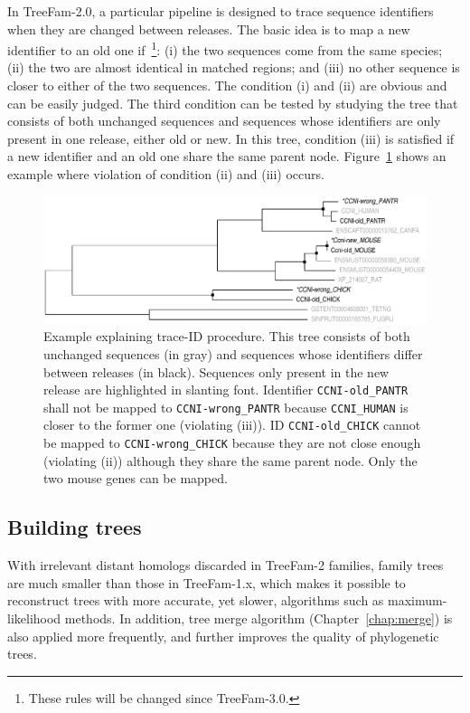 In TreeFam-2.0, a particular pipeline is designed to trace sequence identifiers when they are changed
between releases. The basic idea is to map a new identifier to an old one if~\footnote{These rules
will be changed since TreeFam-3.0.}: (i) the two
sequences come from the same species; (ii) the two are almost identical in matched regions;
and (iii) no other sequence is closer to either of the two sequences. The condition (i) and (ii)
are obvious and can be easily judged. The third condition can be tested by studying the
tree that consists of both unchanged sequences and sequences whose identifiers
are only present in one release, either old or new. In this tree, condition (iii) is satisfied if
a new identifier and an old one share the same parent node. Figure~\ref{fig:exam-traceid} shows
an example where violation of condition (ii) and (iii) occurs.

\begin{figure}[!hb]
\includegraphics[width=\textwidth]{traceid}
\caption[Example explaining trace-ID procedure]{Example explaining trace-ID procedure. This tree consists of both
unchanged sequences (in gray) and sequences whose identifiers differ between releases (in black).
Sequences only present in the new release are highlighted in slanting font.
Identifier {\tt CCNI-old\_PANTR} shall not be mapped to {\tt *CCNI-wrong\_PANTR}
because {\tt CCNI\_HUMAN} is closer to the former one (violating (iii)).
ID {\tt CCNI-old\_CHICK} cannot be mapped to {\tt *CCNI-wrong\_CHICK} because
they are not close enough (violating (ii)) although they share the same parent node.
Only the two mouse genes can be mapped.
}\label{fig:exam-traceid}
\end{figure}

\subsection{Building trees}
With irrelevant distant homologs discarded in TreeFam-2 families, family trees are much smaller than those in
TreeFam-1.x, which makes it possible to reconstruct trees with more accurate, yet
slower, algorithms such as maximum-likelihood methods. In addition, tree merge algorithm (Chapter~\ref{chap:merge})
is also applied more frequently, and further improves the quality of phylogenetic trees.

